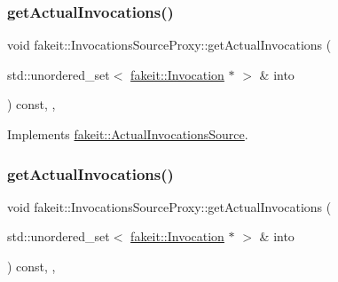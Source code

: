 \mbox{\label{structfakeit_1_1InvocationsSourceProxy_af06b5d62b0c4ff1e3048fae5d7ddd8c3}} 
\subsubsection{\texorpdfstring{getActualInvocations()}{getActualInvocations()}\hspace{0.1cm}{\footnotesize\ttfamily [3/9]}}
{\footnotesize\ttfamily void fakeit\+::\+Invocations\+Source\+Proxy\+::get\+Actual\+Invocations (\begin{DoxyParamCaption}\item[{std\+::unordered\+\_\+set$<$ \mbox{\hyperlink{structfakeit_1_1Invocation}{fakeit\+::\+Invocation}} $\ast$ $>$ \&}]{into }\end{DoxyParamCaption}) const\hspace{0.3cm}{\ttfamily [inline]}, {\ttfamily [override]}, {\ttfamily [virtual]}}



Implements \mbox{\hyperlink{structfakeit_1_1ActualInvocationsSource_a274de522e11e1f9b8d70c6e0be9e5a9b}{fakeit\+::\+Actual\+Invocations\+Source}}.

\mbox{\label{structfakeit_1_1InvocationsSourceProxy_af06b5d62b0c4ff1e3048fae5d7ddd8c3}} 
\subsubsection{\texorpdfstring{getActualInvocations()}{getActualInvocations()}\hspace{0.1cm}{\footnotesize\ttfamily [4/9]}}
{\footnotesize\ttfamily void fakeit\+::\+Invocations\+Source\+Proxy\+::get\+Actual\+Invocations (\begin{DoxyParamCaption}\item[{std\+::unordered\+\_\+set$<$ \mbox{\hyperlink{structfakeit_1_1Invocation}{fakeit\+::\+Invocation}} $\ast$ $>$ \&}]{into }\end{DoxyParamCaption}) const\hspace{0.3cm}{\ttfamily [inline]}, {\ttfamily [override]}, {\ttfamily [virtual]}}



